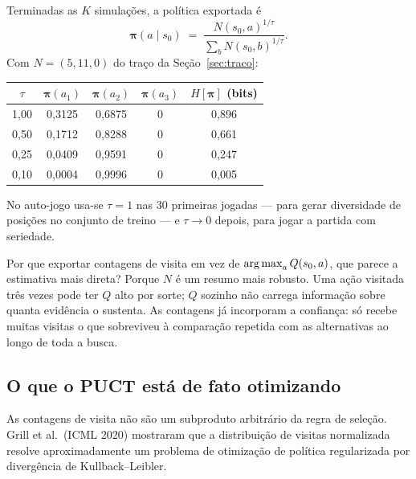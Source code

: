 \documentclass[11pt]{article}
\newcommand{\Nvis}{N}
\newcommand{\raizpol}{\bm{\pi}}
\begin{document}
Terminadas as $K$ simulações, a política exportada é
\[
  \raizpol(a \mid s_0) \;=\; \frac{\Nvis(s_0,a)^{1/\tau}}{\sum_b \Nvis(s_0,b)^{1/\tau}} .
\]
Com $\Nvis = (5,11,0)$ do traço da Seção~\ref{sec:traco}:

\begin{center}
\begin{tabular}{ccccc}
\toprule
$\tau$ & $\raizpol(a_1)$ & $\raizpol(a_2)$ & $\raizpol(a_3)$ & $H[\raizpol]$ (bits) \\
\midrule
1,00 & 0,3125 & 0,6875 & 0 & 0,896 \\
0,50 & 0,1712 & 0,8288 & 0 & 0,661 \\
0,25 & 0,0409 & 0,9591 & 0 & 0,247 \\
0,10 & 0,0004 & 0,9996 & 0 & 0,005 \\
\bottomrule
\end{tabular}
\end{center}

No auto-jogo usa-se $\tau = 1$ nas 30 primeiras jogadas — para gerar diversidade
de posições no conjunto de treino — e $\tau \to 0$ depois, para jogar a partida
com seriedade.

Por que exportar contagens de visita em vez de $\operatorname*{arg\,max}_a Q(s_0,a)$, que parece a
estimativa mais direta? Porque $\Nvis$ é um resumo mais robusto. Uma ação visitada
três vezes pode ter $Q$ alto por sorte; $Q$ sozinho não carrega informação sobre
quanta evidência o sustenta. As contagens já incorporam a confiança: só recebe
muitas visitas o que sobreviveu à comparação repetida com as alternativas ao longo
de toda a busca.

\subsection{O que o PUCT está de fato otimizando}

As contagens de visita não são um subproduto arbitrário da regra de seleção.
Grill et al.\ (ICML 2020) mostraram que a distribuição de visitas normalizada
resolve aproximadamente um problema de otimização de política regularizada por
divergência de Kullback--Leibler.
\end{document}
